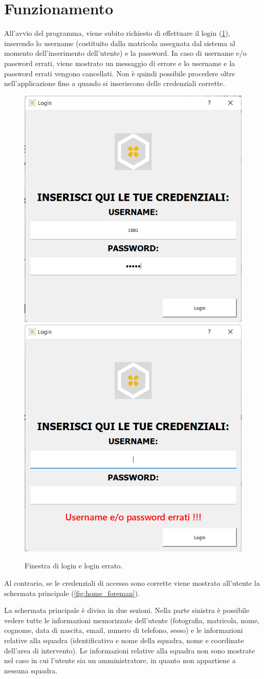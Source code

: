 \section{Funzionamento}
All'avvio del programma, viene subito richiesto di effettuare il login (\Fig\ref{fig:loginform}), inserendo lo username (costituito dalla matricola assegnata dal sistema al momento dell'inserimento dell'utente) e la password. In caso di username e/o password errati, viene mostrato un messaggio di errore e lo username e la password errati vengono cancellati. Non è quindi possibile procedere oltre nell'applicazione fino a quando si inseriscono delle credenziali corrette.
\begin{figure}[h!]
	\centering
	\includegraphics[width=0.4\linewidth]{./ImageFiles/loginform}
	\includegraphics[width=0.4\linewidth]{./ImageFiles/loginform_errato}
	\caption{Finestra di login e login errato.}
	\label{fig:loginform}
\end{figure}
Al contrario, se le credenziali di accesso sono corrette viene mostrato all'utente la schermata principale (\Fig\ref{fig:home_foreman}).

La schermata principale è divisa in due sezioni. Nella parte sinistra è possibile vedere tutte le informazioni memorizzate dell'utente (fotografia, matricola, nome, cognome, data di nascita, email, numero di telefono, sesso) e le informazioni relative alla squadra (identificativo e nome della squadra, nome e coordinate dell'area di intervento). Le informazioni relative alla squadra non sono mostrate nel caso in cui l'utente sia un amministratore, in quanto non appartiene a nessuna squadra.

